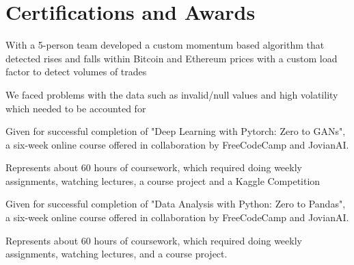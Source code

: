 \documentclass[]{resume-template}
\begin{document}
\begin{minipage}[t]{0.66\textwidth}
    \section{Certifications and Awards}\label{sec:certifications-and-awards}
    \begin{tightemize}
        \item With a  5-person team developed a custom momentum based algorithm that detected rises and falls within
        Bitcoin and Ethereum prices with a custom load factor to detect volumes of trades
        \item We faced problems with the data such as invalid/null values and high volatility which needed to be
        accounted for
    \end{tightemize}
    \sectionsep{}
    \begin{tightemize}
        \item Given for successful completion of "Deep Learning with Pytorch: Zero to GANs",
        a six-week online course offered in collaboration by FreeCodeCamp and JovianAI.
        \item Represents about 60 hours of coursework, which required doing weekly assignments, watching
        lectures, a course project and a Kaggle Competition
    \end{tightemize}
    \sectionsep{}

    \begin{tightemize}
        \item Given for successful completion of "Data Analysis with Python: Zero to Pandas",
        a six-week online course offered in collaboration by FreeCodeCamp and JovianAI.
        \item Represents about 60 hours of coursework, which required doing weekly assignments, watching lectures, and a course project.
    \end{tightemize}
    \sectionsep{}





\end{minipage}
\end{document}

